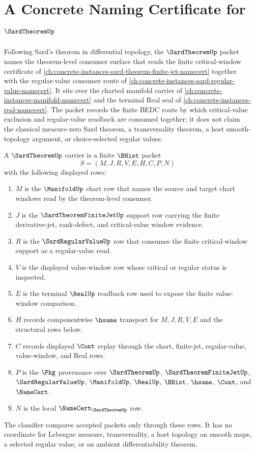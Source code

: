 \chapter{A Concrete Naming Certificate for $\SardTheoremUp$}
\label{ch:concrete-instances-sard-theorem-namecert}

Following Sard's theorem in differential topology, the $\SardTheoremUp$ packet names the theorem-level consumer surface that reads the finite critical-window certificate of \autoref{ch:concrete-instances-sard-theorem-finite-jet-namecert} together with the regular-value consumer route of \autoref{ch:concrete-instances-sard-regular-value-namecert}. It sits over the charted manifold carrier of \autoref{ch:concrete-instances-manifold-namecert} and the terminal Real seal of \autoref{ch:concrete-instances-real-namecert}. The packet records the finite BEDC route by which critical-value exclusion and regular-value readback are consumed together; it does not claim the classical measure-zero Sard theorem, a transversality theorem, a host smooth-topology argument, or choice-selected regular values.

\begin{definition}
\label{def:sard-theorem-carrier}
A $\SardTheoremUp$ carrier is a finite $\BHist$ packet
$$
S=(M,J,R,V,E,H,C,P,N)
$$
with the following displayed rows:
\begin{enumerate}
\item $M$ is the $\ManifoldUp$ chart row that names the source and target chart windows read by the theorem-level consumer.
\item $J$ is the $\SardTheoremFiniteJetUp$ support row carrying the finite derivative-jet, rank-defect, and critical-value window evidence.
\item $R$ is the $\SardRegularValueUp$ row that consumes the finite critical-window support as a regular-value read.
\item $V$ is the displayed value-window row whose critical or regular status is inspected.
\item $E$ is the terminal $\RealUp$ readback row used to expose the finite value-window comparison.
\item $H$ records componentwise $\hsame$ transport for $M,J,R,V,E$ and the structural rows below.
\item $C$ records displayed $\Cont$ replay through the chart, finite-jet, regular-value, value-window, and Real rows.
\item $P$ is the $\Pkg$ provenance over $\SardTheoremUp$, $\SardTheoremFiniteJetUp$, $\SardRegularValueUp$, $\ManifoldUp$, $\RealUp$, $\BHist$, $\hsame$, $\Cont$, and $\NameCert$.
\item $N$ is the local $\NameCert_{\SardTheoremUp}$ row.
\end{enumerate}
The classifier compares accepted packets only through these rows. It has no coordinate for Lebesgue measure, transversality, a host topology on smooth maps, a selected regular value, or an ambient differentiability theorem.
\end{definition}

